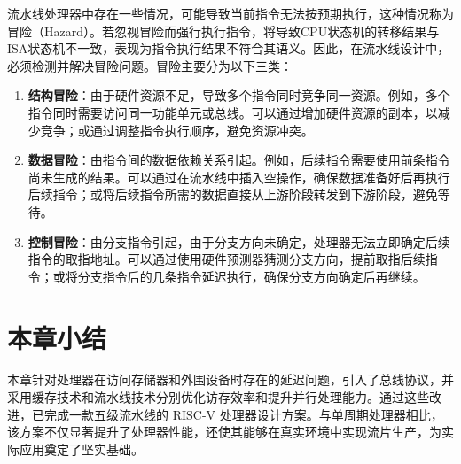 流水线处理器中存在一些情况，可能导致当前指令无法按预期执行，这种情况称为冒险（Hazard）。若忽视冒险而强行执行指令，将导致CPU状态机的转移结果与ISA状态机不一致，表现为指令执行结果不符合其语义。因此，在流水线设计中，必须检测并解决冒险问题。冒险主要分为以下三类：

\begin{enumerate}[label={\arabic*)}, itemsep=0pt, parsep=0pt]
	\item \textbf{结构冒险}：由于硬件资源不足，导致多个指令同时竞争同一资源。例如，多个指令同时需要访问同一功能单元或总线。可以通过增加硬件资源的副本，以减少竞争；或通过调整指令执行顺序，避免资源冲突。
	\item \textbf{数据冒险}：由指令间的数据依赖关系引起。例如，后续指令需要使用前条指令尚未生成的结果。可以通过在流水线中插入空操作，确保数据准备好后再执行后续指令；或将后续指令所需的数据直接从上游阶段转发到下游阶段，避免等待。
	\item \textbf{控制冒险}：由分支指令引起，由于分支方向未确定，处理器无法立即确定后续指令的取指地址。可以通过使用硬件预测器猜测分支方向，提前取指后续指令；或将分支指令后的几条指令延迟执行，确保分支方向确定后再继续。
\end{enumerate}

\section{本章小结}
本章针对处理器在访问存储器和外围设备时存在的延迟问题，引入了总线协议，并采用缓存技术和流水线技术分别优化访存效率和提升并行处理能力。通过这些改进，已完成一款五级流水线的 RISC-V 处理器设计方案。与单周期处理器相比，该方案不仅显著提升了处理器性能，还使其能够在真实环境中实现流片生产，为实际应用奠定了坚实基础。